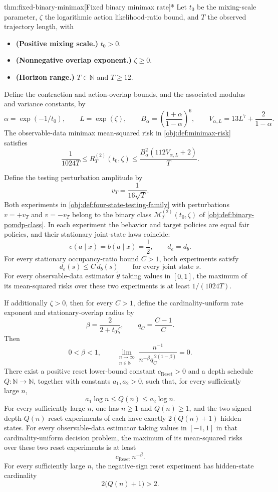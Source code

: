 \begin{theoremv}{thm:fixed-binary-minimax}[Fixed binary minimax rate]*
Let \(t_0\) be the mixing-scale parameter, \(\zeta\) the logarithmic action likelihood-ratio bound, and \(T\) the observed trajectory length, with
\begin{itemize}
\item \textbf{(Positive mixing scale.)} \(t_0>0\).
\item \textbf{(Nonnegative overlap exponent.)} \(\zeta\geq0\).
\item \textbf{(Horizon range.)} \(T\in\mathbb N\) and \(T\geq12\).
\end{itemize}
Define the contraction and action-overlap bounds, and the associated modulus and variance constants, by
\[
\alpha=\exp(-1/t_0),\qquad L=\exp(\zeta),\qquad
B_\alpha=\left(\frac{1+\alpha}{1-\alpha}\right)^6,\qquad
V_{\alpha,L}=13L^7+\frac{2}{1-\alpha}.
\]
The observable-data minimax mean-squared risk in \cref{obj:def:minimax-risk} satisfies
\[
\frac{1}{1024T}
\leq R_T^{(2)}(t_0,\zeta)
\leq \frac{B_\alpha^2(112V_{\alpha,L}+2)}{T}.
\]

Define the testing perturbation amplitude by
\[
v_T=\frac{1}{16\sqrt T}.
\]
Both experiments in \cref{obj:def:four-state-testing-family} with perturbations \(v=+v_T\) and \(v=-v_T\) belong to the binary class \(\mathcal M_T^{(2)}(t_0,\zeta)\) of \cref{obj:def:binary-pomdp-class}. In each experiment the behavior and target policies are equal fair policies, and their stationary joint-state laws coincide:
\[
e(a\mid x)=b(a\mid x)=\frac12,\qquad d_e=d_b.
\]
For every stationary occupancy-ratio bound \(C>1\), both experiments satisfy
\[
d_e(s)\leq C\,d_b(s)
\qquad\text{for every joint state }s.
\]
For every observable-data estimator \(\widetilde\theta\) taking values in \([0,1]\), the maximum of its mean-squared risks over these two experiments is at least \(1/(1024T)\).

If additionally \(\zeta>0\), then for every \(C>1\), define the cardinality-uniform rate exponent and stationary-overlap radius by
\[
\beta=\frac{2}{2+t_0\zeta},\qquad q_C=\frac{C-1}{C}.
\]
Then
\[
0<\beta<1,\qquad
\lim_{\substack{n\to\infty\\ n\in\mathbb N}}
\frac{n^{-1}}{n^{-\beta}q_C^{\,2(1-\beta)}}=0.
\]
There exist a positive reset lower-bound constant \(c_{\mathrm{Reset}}>0\) and a depth schedule \(Q:\mathbb N\to\mathbb N\), together with constants \(a_1,a_2>0\), such that, for every sufficiently large \(n\),
\[
a_1\log n\leq Q(n)\leq a_2\log n.
\]
For every sufficiently large \(n\), one has \(n\geq1\) and \(Q(n)\geq1\), and the two signed depth-\(Q(n)\) reset experiments of \citet{CausalSmithLatentOverlap2026} each have exactly \(2(Q(n)+1)\) hidden states. For every observable-data estimator taking values in \([-1,1]\) in that cardinality-uniform decision problem, the maximum of its mean-squared risks over these two reset experiments is at least
\[
c_{\mathrm{Reset}}\,n^{-\beta}.
\]
For every sufficiently large \(n\), the negative-sign reset experiment has hidden-state cardinality
\[
2\bigl(Q(n)+1\bigr)>2.
\]
\end{theoremv}
